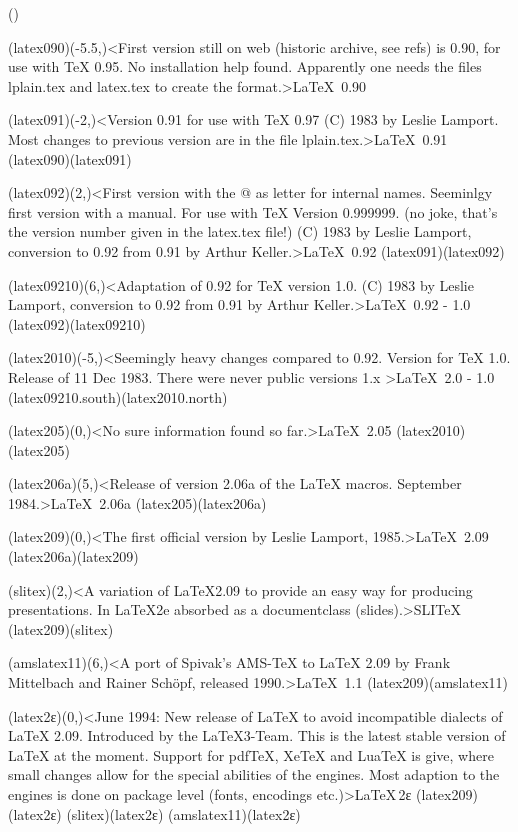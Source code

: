 \tograph*(){

	\tonode(latex090)(-5.5,\layer)<First version still on web (historic archive, see refs) is 0.90, for use with TeX 0.95. No installation help found. Apparently one needs the files lplain.tex and latex.tex to create the format.>{\LaTeX\ 0.90}
	
	\tonode(latex091)(-2,\layer)<Version 0.91 for use with TeX 0.97 (C) 1983 by Leslie Lamport. Most changes to previous version are in the file lplain.tex.>{\LaTeX\ 0.91}
	\todraw(latex090)(latex091)
	
	\tonode(latex092)(2,\layer)<First version with the @ as letter for internal names. Seeminlgy first version with a manual. For use with TeX Version 0.999999. (no joke, that's the version number given in the latex.tex file!) (C) 1983 by Leslie Lamport, conversion to 0.92 from 0.91 by Arthur Keller.>{\LaTeX\ 0.92}
	\todraw(latex091)(latex092)

	\tonode(latex09210)(6,\layer)<Adaptation of 0.92 for TeX version 1.0. (C) 1983 by Leslie Lamport, conversion to 0.92 from 0.91 by Arthur Keller.>{\LaTeX\ 0.92 - 1.0}
	\todraw(latex092)(latex09210)
	\steplayer[-2.3]

	\tonode(latex2010)(-5,\layer)<Seemingly heavy changes compared to 0.92. Version for TeX 1.0. Release of 11 Dec 1983. There were never public versions 1.x >{\LaTeX\ 2.0 - 1.0}
	\todraw(latex09210.south)(latex2010.north)
	
	\tonode(latex205)(0,\layer)<No sure information found so far.>{\LaTeX\ 2.05}
	\todraw(latex2010)(latex205)
	
	\tonode(latex206a)(5,\layer)<Release of version 2.06a of the LaTeX macros. September 1984.>{\LaTeX\ 2.06a}
	\todraw(latex205)(latex206a)
	
	\steplayer[-2.5]
	\tonode[\vip](latex209)(0,\layer)<The first official version by Leslie Lamport, 1985.>{\LaTeX\ 2.09}
	\todraw(latex206a)(latex209)
	
	\steplayer[-2]
	\tonode(slitex)(2,\layer)<A variation of LaTeX2.09 to provide an easy way for producing presentations. In LaTeX2e absorbed as a documentclass (slides).>{SLI\TeX}
	\todraw(latex209)(slitex)
	
	\tonode(amslatex11)(6,\layer)<A port of Spivak's AMS-TeX to LaTeX 2.09 by Frank Mittelbach and Rainer Schöpf, released 1990.>{\AMS\LaTeX\ 1.1}
	\todraw(latex209)(amslatex11)
	
	\steplayer[-1.7]
	\tonode[\vip](latex2ε)(0,\layer)<June 1994: New release of LaTeX to avoid incompatible dialects of LaTeX 2.09. Introduced by the LaTeX3-Team. This is the latest stable version of LaTeX at the moment. Support for pdfTeX, XeTeX and LuaTeX is give, where small changes allow for the special abilities of the engines. Most adaption to the engines is done on package level (fonts, encodings etc.)>{\LaTeX\,2\raisebox{-.5ex}ε}
	\todraw*(latex209)(latex2ε)
	\todraw[dashed](slitex)(latex2ε)
	\todraw[dashed](amslatex11)(latex2ε)

}
